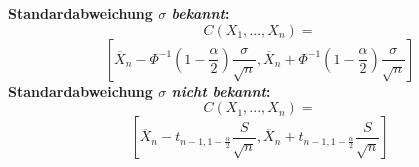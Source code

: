 \textbf{Standardabweichung $\sigma$ \emph{bekannt}:}
\[
C(X_1,...,X_n)=
\]
\[
\left[\overline{X}_n-\Phi^{-1}\left(1-\frac{\alpha}{2}\right)\frac{\sigma}{\sqrt{n}},
\overline{X}_n+\Phi^{-1}\left(1-\frac{\alpha}{2}\right)\frac{\sigma}{\sqrt{n}}\right]
\]
\textbf{Standardabweichung $\sigma$ \emph{nicht bekannt}:}
\[
C(X_1,...,X_n)=
\]
\[
\left[\overline{X}_n-t_{n-1,1-\frac{\alpha}{2}}\frac{S}{\sqrt{n}},
\overline{X}_n+t_{n-1,1-\frac{\alpha}{2}}\frac{S}{\sqrt{n}}\right]
\]
